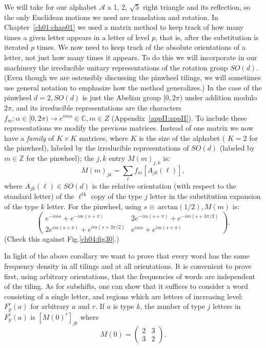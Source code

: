 \documentclass[reqno]{stml-l}
\theoremstyle{plain}
\theoremstyle{definition}
\numberwithin{equation}{chapter}
\begin{document}
We will take for our alphabet $\mathcal{A}$ a 1, 2, $\sqrt{5}$ right triangle and its reflection, so the only Euclidean motions we need are translation and rotation. In Chapter~\ref{ch01:chap01} we used a matrix method to keep track of how many times a given letter appears in a letter of level $p$, that is, after the substitution is iterated $p$ times. We now need to keep track of the absolute orientations of a letter, not just how many times it appears. To do this we will incorporate in our machinery the irreducible unitary representations of the rotation group $SO(d)$. (Even though we are ostensibly discussing the pinwheel tilings, we will sometimes use general notation to emphasize how the method generalizes.) In the case of the pinwheel $d=2,SO(d)$ is just the Abelian group $[0,2\pi)$ under addition modulo $2\pi$, and its irreducible representations are the characters $f_{m}:\alpha\in[0,2\pi)\rightarrow e^{im\alpha}\in \mathbb{C},m\in Z$ (Appendix~\ref{appII:appII}). To include these representations we modify the previous matrices. Instead of one matrix we now have a \emph{family} of $K\times K$ matrices, where $K$ is the size of the alphabet ( $K=2$ for the pinwheel), labeled by the irreducible representations of $SO(d)$ (labeled by $m\in \mathbb{Z}$ for the pinwheel); the $j,k$ entry $M(m)_{j,k}$ is:
\begin{equation}\label{ch04:eqn4.8}
M(m)_{jk}=\sum\limits_{\ell}f_{m}[A_{jk}(\ell)],
\end{equation}
where $A_{jk}(\ell)\in SO(d)$ is the relative orientation (with respect to the standard letter) of the $\ell^{\mathrm{th}}$ copy of the type $j$ letter in the substitution expansion of the type $k$ letter. For the pinwheel, using $s\equiv\,\mathrm{arctan}(1/2),M(m)$ is:
\begin{equation}
\left(\begin{matrix}
e^{-ims}+e^{-im(s+\pi)} & 2e^{-im(s+\pi)}+e^{-im(s+3\pi/2)}\\
2e^{im(s+\pi)}+e^{im(s+3\pi/2)} & e^{ims}+e^{im(s+\pi)}
\end{matrix}\right). \label{ch04:eqn4.9}
\end{equation}
(Check this against Fig.\ref{ch04:fig30}.)

In light of the above corollary we want to prove that every word has the same frequency density in all tilings and at all orientations. It is convenient to prove first, using arbitrary orientations, that the frequencies of words are independent of the tiling. As for subshifts, one can show that it suffices to consider a word consisting of a single letter, and regions which are letters of increasing level: $F_{p}^{r}(a)$ for arbitrary $a$ and $r$. If $a$ is type $k$, the number of type $j$ letters in $F_{p}^{r}(a)$ is $[M(0)^{r}]_{jk}$ where
\begin{equation}\label{ch04:eqn4.10}
M(0)=\left(\begin{matrix}
2 & 3\\
3 & 2
\end{matrix}\right).
\end{equation}
\end{document}
